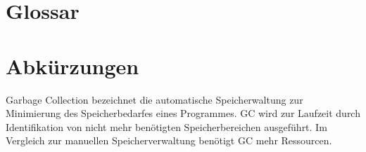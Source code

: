 \documentclass[
12pt,
english,
ngerman,
headsepline,
twoside,
openright,
numbers=noenddot,version=first
]{scrreprt}
\begin{document}
\lstlistoflistings


\listoftables



\chapter*{Glossar}

\printglossary[type=\acronymtype]




\chapter*{Abkürzungen}


\begin{acronym}[Bash]



\glqq Garbage Collection\grqq{} bezeichnet die automatische Speicherwaltung zur Minimierung des Speicherbedarfes eines Programmes.
\ac{GC} wird zur Laufzeit durch Identifikation von nicht mehr benötigten Speicherbereichen ausgeführt.
Im Vergleich zur manuellen Speicherverwaltung benötigt \ac{GC} mehr Ressourcen.

\end{acronym}



\end{document}
